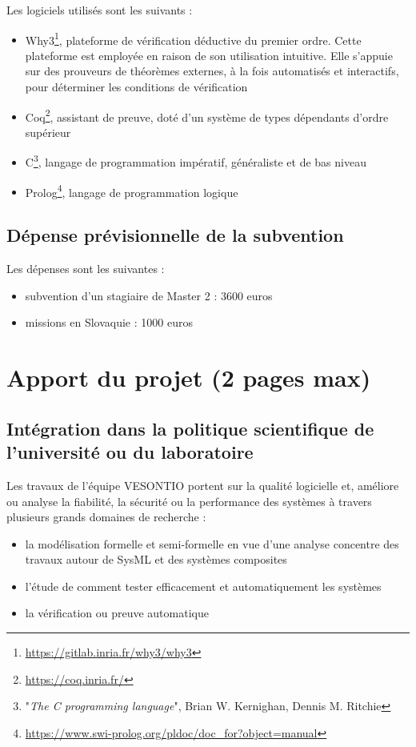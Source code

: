 \documentclass[10pt, a4paper, french]{article}
\begin{document}
Les logiciels utilisés sont les suivants :
\begin{itemize}
    \item  Why3\footnote{\url{https://gitlab.inria.fr/why3/why3}}, plateforme de vérification déductive du premier ordre.
Cette plateforme est employée en raison de son utilisation intuitive.  Elle s'appuie sur des prouveurs de théorèmes externes, à la fois automatisés et interactifs, pour déterminer les conditions de vérification
    \item Coq\footnote{\url{https://coq.inria.fr/}}, assistant de preuve, doté d'un système de types dépendants d'ordre supérieur
    \item C\footnote{"\textit{The C programming language}", Brian W. Kernighan, Dennis M. Ritchie }, langage de programmation impératif, généraliste et de bas niveau
    \item Prolog\footnote{\url{https://www.swi-prolog.org/pldoc/doc_for?object=manual}}, langage de programmation logique
\end{itemize}





\subsection{Dépense prévisionnelle de la subvention}

Les dépenses sont les suivantes :
\begin{itemize}
    \item subvention d'un stagiaire de Master 2 : 3600 euros
    \item missions en Slovaquie : 1000 euros
\end{itemize}



\newpage


\section{Apport du projet (2 pages max)}
\subsection{Intégration dans la politique scientifique de l'université ou du laboratoire}


Les travaux de l'équipe VESONTIO portent sur la qualité logicielle et, améliore ou analyse la fiabilité, la sécurité ou la performance des systèmes à travers plusieurs grands domaines de recherche :
\begin{itemize}
	\item la modélisation formelle et semi-formelle en vue d'une analyse concentre des travaux autour de SysML et des systèmes composites
	\item l'étude de comment tester efficacement et automatiquement les systèmes
	\item la vérification ou preuve automatique 
\end{itemize} 
\end{document}
